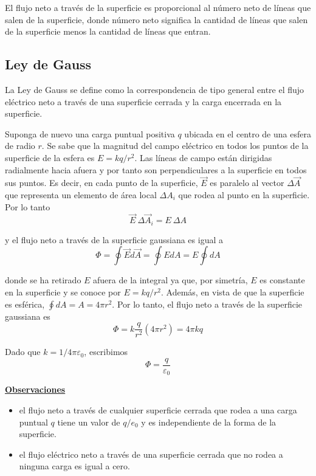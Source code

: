     \PN El flujo neto a través de la superficie es proporcional al número neto de líneas que salen de la superficie,
    donde número neto significa la cantidad de líneas que salen de la superficie menos la cantidad de líneas que entran.

    \subsection{Ley de Gauss}
      \PN La Ley de Gauss se define como la correspondencia de tipo general entre el flujo eléctrico neto a través de
      una superficie cerrada y la carga encerrada en la superficie.

      \PN Suponga de nuevo una carga puntual positiva $q$ ubicada en el centro de una esfera de radio $r$. Se sabe que
      la magnitud del campo eléctrico en todos los puntos de la superficie de la esfera es $E = k q/r^{2}$. Las líneas
      de campo están dirigidas radialmente hacia afuera y por tanto son perpendiculares a la superficie en todos sus
      puntos. Es decir, en cada punto de la superficie, $\vec{E}$ es paralelo al vector $\Delta \vec{A}$ que representa
      un elemento de área local $\Delta A_{i}$ que rodea al punto en la superficie. Por lo tanto
      \begin{equation*}
        \vec{E} \ \Delta \vec{A}_{i} = E \ \Delta A
      \end{equation*}

      \PN y el flujo neto a través de la superficie gaussiana es igual a
      \begin{equation*}
        \Phi = \oint \vec{E} d\vec{A} = \oint E dA = E \oint dA
      \end{equation*}

      \PN donde se ha retirado $E$ afuera de la integral ya que, por simetría, $E$ es constante en la superficie y se
      conoce por $E = k q/r^{2}$. Además, en vista de que la superficie es esférica, $\oint dA = A = 4 \pi r^{2}$. Por
      lo tanto, el flujo neto a través de la superficie gaussiana es
      \begin{equation*}
        \Phi = k \frac{q}{r^{2}} (4 \pi r^{2}) = 4 \pi kq
      \end{equation*}

      \PN Dado que $k = 1/4 \pi \varepsilon_{0}$, escribimos
      \begin{equation*}
        \Phi = \frac{q}{\varepsilon_{0}}
      \end{equation*}

      \PN \textbf{\underline{Observaciones}}
      \begin{itemize}
        \item el flujo neto a través de cualquier superficie cerrada que rodea a una carga puntual $q$ tiene un valor de
        $q/e_{0}$ y es independiente de la forma de la superficie.
        \item el flujo eléctrico neto a través de una superficie cerrada que no rodea a ninguna carga es igual a cero.
      \end{itemize}

